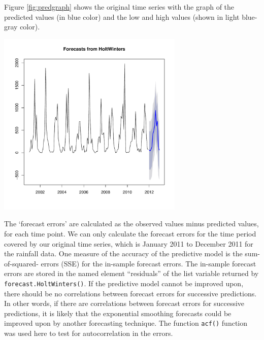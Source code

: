 Figure \eqref{fig:predgraph} shows the original time series with the graph of the predicted values (in blue color) and the low and high values (shown in light blue-gray color).

\begin{center}
\centering
\includegraphics[width=0.7\maxwidth,height=3.5in]{figure/listings-HWComputations3}
\end{center}

The ‘forecast errors’ are calculated as the observed values minus predicted values, for each time point. We can
only calculate the forecast errors for the time period covered by our original time series, which is January 2011 to December 2011 for
the rainfall data. One measure of the accuracy of the predictive model is the sum-of-squared-
errors (SSE) for the in-sample forecast errors.
The in-sample forecast errors are stored in the named element “residuals” of the list variable returned by \texttt{forecast.HoltWinters()}. If the predictive model cannot be improved upon, there should be no correlations between
forecast errors for successive predictions. In other words, if there are correlations between forecast errors for
successive predictions, it is likely that the  exponential smoothing forecasts could be improved upon by
another forecasting technique. The function \texttt{acf()} function was used here to test for autocorrelation in the errors.


